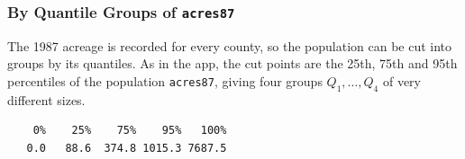 \documentclass[
  letterpaper,
  DIV=11,
  numbers=noendperiod]{scrreprt}
\newenvironment{Shaded}{\begin{snugshade}}{\end{snugshade}}
\newcommand{\AttributeTok}[1]{\textcolor[rgb]{0.40,0.45,0.13}{#1}}
\newcommand{\DecValTok}[1]{\textcolor[rgb]{0.68,0.00,0.00}{#1}}
\newcommand{\DocumentationTok}[1]{\textcolor[rgb]{0.37,0.37,0.37}{\textit{#1}}}
\newcommand{\FloatTok}[1]{\textcolor[rgb]{0.68,0.00,0.00}{#1}}
\newcommand{\FunctionTok}[1]{\textcolor[rgb]{0.28,0.35,0.67}{#1}}
\newcommand{\NormalTok}[1]{\textcolor[rgb]{0.00,0.23,0.31}{#1}}
\newcommand{\OtherTok}[1]{\textcolor[rgb]{0.00,0.23,0.31}{#1}}
\newcommand{\SpecialCharTok}[1]{\textcolor[rgb]{0.37,0.37,0.37}{#1}}
\renewcommand{\[}{\begin{equation}}
\renewcommand{\]}{\end{equation}}
\begin{document}
\subsubsection{\texorpdfstring{By Quantile Groups of
\texttt{acres87}}{By Quantile Groups of acres87}}\label{by-quantile-groups-of-acres87}

The 1987 acreage is recorded for every county, so the population can be
cut into groups by its quantiles. As in the app, the cut points are the
25th, 75th and 95th percentiles of the population \texttt{acres87},
giving four groups \(Q_1,\ldots,Q_4\) of very different sizes.

\begin{Shaded}
\end{Shaded}

\begin{verbatim}
    0%    25%    75%    95%   100% 
   0.0   88.6  374.8 1015.3 7687.5 
\end{verbatim}
\end{document}
